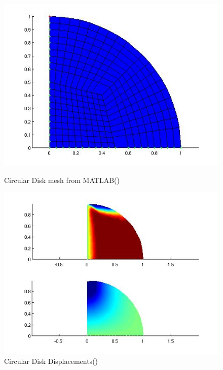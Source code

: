 \begin{figure}[htbp]
\begin{minipage}{0.45\linewidth}
    \includegraphics[width=\linewidth]{fig/circular_disk52_mesh_matlab.jpg}
    \caption{Circular Disk mesh from MATLAB()}
    \label{fig:CircularDisk52MeshMATLAB}
  \end{minipage}
  \hfill
  \begin{minipage}{0.45\linewidth}
    \includegraphics[width=\linewidth]{fig/circular_disk52_disp_matlab.jpg}
    \caption{Circular Disk Displacements()}
    \label{fig:CircularDisk52Displacements}
  \end{minipage}
\end{figure}

\clearpage
